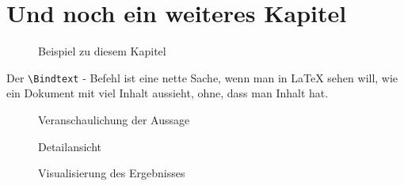 

\chapter{Und noch ein weiteres Kapitel}

\begin{figure}[p]
  \centering
  \caption{Beispiel zu diesem Kapitel}
  \label{example}
\end{figure}

\Blindtext 
Der \verb $\Bindtext$ - Befehl ist eine nette Sache, wenn man in \LaTeX{} sehen will, 
wie ein Dokument mit viel Inhalt aussieht, ohne, dass man Inhalt hat.

\begin{figure}[p]
  \centering
  \caption{Veranschaulichung der Aussage}
  \label{fig:illustration}				%
\end{figure}

\begin{figure}[p]
  \centering
  \caption{Detailansicht}
  \label{fig:detail}					%
\end{figure}

\begin{figure}[p]
  \centering
  \caption{Visualisierung des Ergebnisses}
  \label{fig:visualization}				%
\end{figure}